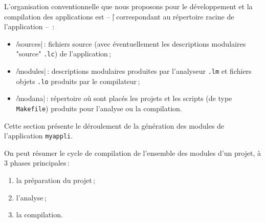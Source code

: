 
L'organisation conventionnelle que nous proposons pour le
d\'{e}veloppement et la compilation des applications est
-- \|<root-dir>| correspondant au r\'{e}pertoire racine de 
l'application -- \,:
\begin{itemize}
\item \|<root-dir>/sources|\,: fichiers source (avec \'{e}ventuellement
les descriptions modulaires "source" {\tt .lc}) de l'application\,;
\item \|<root-dir>/modules|\,: descriptions modulaires produites
par l'analyseur {\tt .lm} et fichiers objets {\tt .lo} produits
par le compilateur\,;
\item \|<root-dir>/modana|\,: r\'{e}pertoire o\`{u} sont plac\'{e}s
les projets et les scripts (de type {\tt Makefile})
produits pour l'analyse ou la compilation.
\end{itemize}



Cette section pr\'{e}sente le d\'{e}roulement de la g\'{e}n\'{e}ration
des modules de l'application {\tt myappli}.

On peut r\'{e}sumer le cycle de compilation de l'ensemble des modules
d'un projet, \`{a} 3 phases principales\,: 
\begin{enumerate}
\item la pr\'{e}paration du projet\,;
\item l'analyse\,;
\item la compilation.
\end{enumerate}

